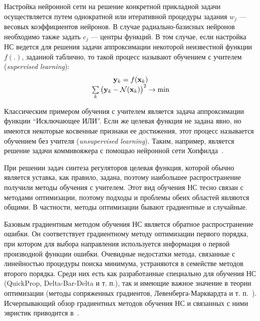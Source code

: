 

Настройка нейронной сети на решение конкретной прикладной задачи
осуществляется путем однократной или итеративной процедуры задания
$w_j$ --- весовых коэффициентов нейронов.  В случае радиально-базисных
нейронов необходимо также задать $c_j$ --- центры функций.  В том
случае, если настройка НС ведется для решения задачи аппроксимации
некоторой неизвестной функции $f(.)$, заданной таблично, то такой
процесс называют обучением с учителем ({\em supervised learning}):
\begin{equation}\label{eq:supervised_learning_task}
  \begin{array}{c}
    \mathbf{y}_k=f(\mathbf{x}_k)\\
    \sum\limits_k\big(\mathbf{y}_k-\NN(\mathbf{x}_k)\big)^2\rightarrow\min
  \end{array}
\end{equation}

Классическим примером обучения с учителем является задача
аппроксимации функции ``Исключающее ИЛИ''.  Если же целевая функция не
задана явно, но имеются некоторые косвенные признаки ее достижения,
этот процесс называется обучением без учителя ({\em unsupervised
  learning}).  Таким, например, является решение задачи коммивояжера с
помощью нейронной сети Хопфилда~\cite{wasser92}.

При решении задач синтеза регуляторов целевая функция, которой обычно
является уставка, как правило, задана, поэтому наибольшее
распространение получили методы обучения с учителем.  Этот вид
обучения НС тесно связан с методами оптимизации, поэтому подходы и
проблемы обеих областей являются общими.  В частности, методы
оптимизации бывают градиентные и случайные.

Базовым градиентным методом обучения НС является обратное
распространение ошибки.  Он соответствует градиентному методу
оптимизации первого порядка, при котором для выбора направления
используется информация о первой производной функции ошибки.
Очевидные недостатки метода, связанные с линейностью процедуры поиска
минимума, устраняются в семействе методов второго порядка.  Среди них
есть как разработанные специально для обучения НС (QuickProp,
Delta-Bar-Delta и т. п.), так и имеющие важное значение в теории
оптимизации (методы сопряженных градиентов, Левенберга-Марквардта и
т. п.~\cite{himmelblau75}).  Исчерпывающий обзор градиентных методов
обучения НС и связанных с ними эвристик приводится в~\cite{gibb96}.

